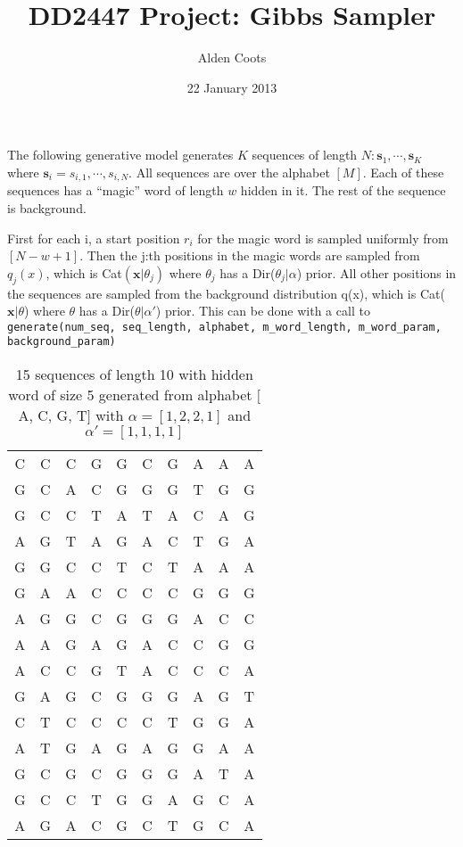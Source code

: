\documentclass[a4paper,12pt]{article}
\begin{document}
\title{DD2447 Project: Gibbs Sampler}
\author{Alden Coots}
\date{22 January 2013}
\maketitle

The following generative model generates $K$ sequences of length $N: \mathbf{s}_1,\cdots,\mathbf{s}_K$ where $\mathbf{s}_i = s_{i,1},\cdots,s_{i,N}$.
All sequences are over the alphabet $[M]$.
Each of these sequences has a ``magic'' word of length $w$ hidden in it.
The rest of the sequence is background.

First for each i, a start position $r_i$ for the magic word is sampled uniformly from $[N-w+1]$.
Then the j:th positions in the magic words are sampled from $q_j(x)$, which is Cat$(\mathbf{x}|\theta_j)$ where $\theta_j$ has a Dir($\theta_j|\alpha$) prior.
All other positions in the sequences are sampled from the background distribution q(x), which is Cat($\mathbf{x}|\theta$) where $\theta$ has a Dir($\theta|\alpha'$) prior.
This can be done with a call to \texttt{generate(num\_seq, seq\_length, alphabet, m\_word\_length, m\_word\_param, background\_param)}

	\begin{table}[h!]
		\centering
		\begin{tabular} {|c c c c c c c c c c|}
			\hline
			C & C & C & G & G & C & G & A & A & A \\ 
			G & C & A & C & G & G & G & T & G & G \\
			G & C & C & T & A & T & A & C & A & G \\
			A & G & T & A & G & A & C & T & G & A \\
			G & G & C & C & T & C & T & A & A & A \\
			G & A & A & C & C & C & C & G & G & G \\
			A & G & G & C & G & G & G & A & C & C \\
			A & A & G & A & G & A & C & C & G & G \\
			A & C & C & G & T & A & C & C & C & A \\
			G & A & G & C & G & G & G & A & G & T \\
			C & T & C & C & C & C & T & G & G & A \\
			A & T & G & A & G & A & G & G & A & A \\
			G & C & G & C & G & G & G & A & T & A \\
			G & C & C & T & G & G & A & G & C & A \\
			A & G & A & C & G & C & T & G & C & A \\
			\hline
		\end{tabular}
		\caption{15 sequences of length 10 with hidden word of size 5 generated from alphabet $[$A, C, G, T$]$ with $\alpha = [1,2,2,1]$ and $\alpha' = [1,1,1,1]$}
	\end{table}
\end{document}
